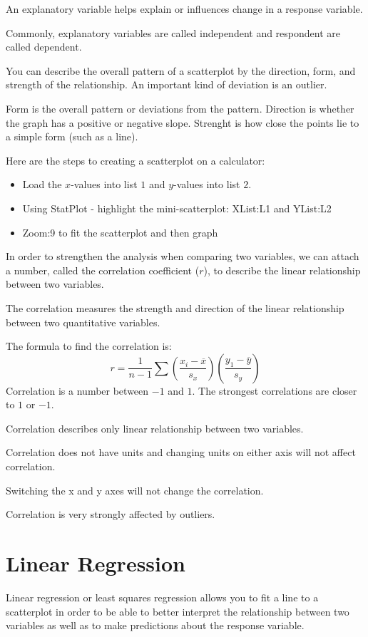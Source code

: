 \documentclass[../stats.tex]{subfiles}
\begin{document}
An explanatory variable helps explain or influences change in a response variable.

Commonly, explanatory variables are called independent and respondent are called dependent. 

You can describe the overall pattern of a scatterplot by the direction, form, and strength of the 
relationship. An important kind of deviation is an outlier.

Form is the overall pattern or deviations from the pattern. Direction is whether the graph has a 
positive or negative slope. Strenght is how close the points lie to a simple form (such as a line).

Here are the steps to creating a scatterplot on a calculator:
\begin{itemize}
    \item Load the $x$-values into list $1$ and $y$-values into list $2$.
    \item Using StatPlot - highlight the mini-scatterplot: XList:L1 and YList:L2
    \item Zoom:9 to fit the scatterplot and then graph
\end{itemize}

In order to strengthen the analysis when comparing two variables, we can attach a number, 
called the correlation coefficient ($r$), to describe the linear relationship between two variables.

The correlation measures the strength and direction of the linear relationship between two quantitative variables. 

The formula to find the correlation is:
\[r=\frac{1}{n-1}\sum \left(\frac{x_i-\overline{x}}{s_x}\right)\left(\frac{y_1-\overline{y}}{s_y}\right)\]
Correlation is a number between $-1$ and $1$. The strongest correlations are closer to $1$ or $-1$. 

Correlation describes only linear relationship between two variables. 

Correlation does not have units and changing units on either axis will not affect correlation.

Switching the x and y axes will not change the correlation.

Correlation is very strongly affected by outliers.

\section{Linear Regression}
Linear regression or least squares regression allows you to fit a line to a scatterplot in order to be 
able to better interpret the relationship between two variables as well as to make predictions about the response variable.
\end{document}
